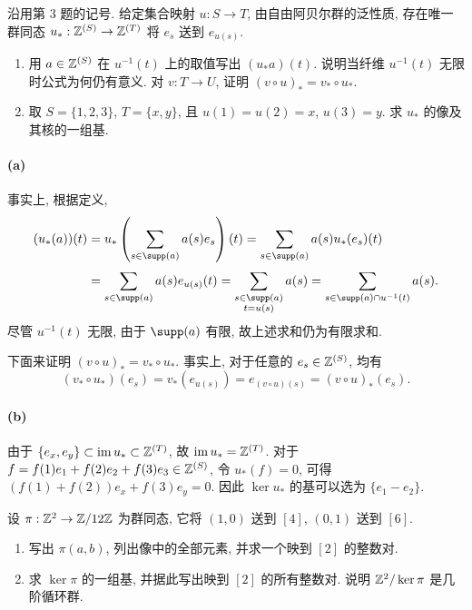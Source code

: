 \documentclass{article}
\begin{document}
\begin{problem}
沿用第 3 题的记号. 给定集合映射 $u:S\to T$, 由自由阿贝尔群的泛性质, 存在唯一群同态 $u_*:\mathbb{Z}^{(S)}\to\mathbb{Z}^{(T)}$ 将 $e_s$ 送到 $e_{u(s)}$.
\begin{enumerate}
  \item[(a)] 用 $a\in\mathbb{Z}^{(S)}$ 在 $u^{-1}(t)$ 上的取值写出 $(u_*a)(t)$. 说明当纤维 $u^{-1}(t)$ 无限时公式为何仍有意义. 对 $v:T\to U$, 证明 $(v\circ u)_*=v_*\circ u_*$.
  \item[(b)] 取 $S=\{1,2,3\}$, $T=\{x,y\}$, 且 $u(1)=u(2)=x$, $u(3)=y$. 求 $u_*$ 的像及其核的一组基.
\end{enumerate}
\end{problem}

\begin{solution}
	\paragraph{(a)} 事实上, 根据定义, 
	\begin{align*}
		(u_*(a))(t) &= u_*\left( \sum_{s \in \supp(a)}^{}a(s)e_s \right) (t) = \sum_{s \in \supp(a)}^{} a(s) u_*(e_s)(t) \\
		&= \sum_{s \in \supp(a)}^{}a(s)e_{u(s)}(t) 
		= \sum_{\substack{s \in \supp(a) \\ t = u(s)}}^{} a(s)
		= \sum_{s \in \supp(a) \cap u^{-1}(t)}^{} a(s).
	\end{align*}
	尽管 $u^{-1}(t)$ 无限, 由于 $\supp(a)$ 有限, 故上述求和仍为有限求和.

	下面来证明 $(v \circ u)_* = v_* \circ u_*$. 事实上, 对于任意的 $e_s \in \mathbb{Z}^{(S)}$, 均有
	\[ (v_* \circ u_*)(e_s) = v_*(e_{u(s)}) = e_{(v \circ u)(s)} = (v \circ u)_*(e_s). \]

	\paragraph{(b)} 由于 $\{e_x, e_y\} \subset \operatorname{im} u_* \subset \mathbb{Z}^{(T)}$, 故 $\operatorname{im} u_* = \mathbb{Z}^{(T)}$. 对于 $f = f(1)e_1 + f(2) e_2 + f(3)e_3 \in \mathbb{Z}^{(S)}$, 令 $u_*(f) = 0$, 可得 $(f(1) + f(2))e_x + f(3) e_y = 0$. 因此 $\ker u_*$ 的基可以选为 $\{e_1 - e_2\}$.
\end{solution}



\begin{problem}
设 $\pi:\mathbb{Z}^2\to\mathbb{Z}/12\mathbb{Z}$ 为群同态, 它将 $(1,0)$ 送到 $[4]$, $(0,1)$ 送到 $[6]$.
\begin{enumerate}
  \item[(a)] 写出 $\pi(a,b)$, 列出像中的全部元素, 并求一个映到 $[2]$ 的整数对.
  \item[(b)] 求 $\ker\pi$ 的一组基, 并据此写出映到 $[2]$ 的所有整数对. 说明 $\mathbb{Z}^2/\ker\pi$ 是几阶循环群.
\end{enumerate}
\end{problem}
\end{document}
